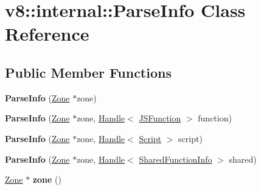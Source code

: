 \hypertarget{classv8_1_1internal_1_1_parse_info}{}\section{v8\+:\+:internal\+:\+:Parse\+Info Class Reference}
\label{classv8_1_1internal_1_1_parse_info}
\subsection*{Public Member Functions}
\begin{DoxyCompactItemize}
\item 
{\bfseries Parse\+Info} (\hyperlink{classv8_1_1internal_1_1_zone}{Zone} $\ast$zone)\hypertarget{classv8_1_1internal_1_1_parse_info_ace4e382e1f73e38383acb52e2048e5f7}{}\label{classv8_1_1internal_1_1_parse_info_ace4e382e1f73e38383acb52e2048e5f7}

\item 
{\bfseries Parse\+Info} (\hyperlink{classv8_1_1internal_1_1_zone}{Zone} $\ast$zone, \hyperlink{classv8_1_1internal_1_1_handle}{Handle}$<$ \hyperlink{classv8_1_1internal_1_1_j_s_function}{J\+S\+Function} $>$ function)\hypertarget{classv8_1_1internal_1_1_parse_info_ad09a33f6e2a577ca7d56ba65621e1aeb}{}\label{classv8_1_1internal_1_1_parse_info_ad09a33f6e2a577ca7d56ba65621e1aeb}

\item 
{\bfseries Parse\+Info} (\hyperlink{classv8_1_1internal_1_1_zone}{Zone} $\ast$zone, \hyperlink{classv8_1_1internal_1_1_handle}{Handle}$<$ \hyperlink{classv8_1_1internal_1_1_script}{Script} $>$ script)\hypertarget{classv8_1_1internal_1_1_parse_info_ad76946d578f9051223b776c3d607d990}{}\label{classv8_1_1internal_1_1_parse_info_ad76946d578f9051223b776c3d607d990}

\item 
{\bfseries Parse\+Info} (\hyperlink{classv8_1_1internal_1_1_zone}{Zone} $\ast$zone, \hyperlink{classv8_1_1internal_1_1_handle}{Handle}$<$ \hyperlink{classv8_1_1internal_1_1_shared_function_info}{Shared\+Function\+Info} $>$ shared)\hypertarget{classv8_1_1internal_1_1_parse_info_a4cb5136a117b72b19b2c3541667b98e5}{}\label{classv8_1_1internal_1_1_parse_info_a4cb5136a117b72b19b2c3541667b98e5}

\item 
\hyperlink{classv8_1_1internal_1_1_zone}{Zone} $\ast$ {\bfseries zone} ()\hypertarget{classv8_1_1internal_1_1_parse_info_ad2cb243348f3c3b3ffb3b91a65a54d5d}{}\label{classv8_1_1internal_1_1_parse_info_ad2cb243348f3c3b3ffb3b91a65a54d5d}


\end{DoxyCompactItemize}
